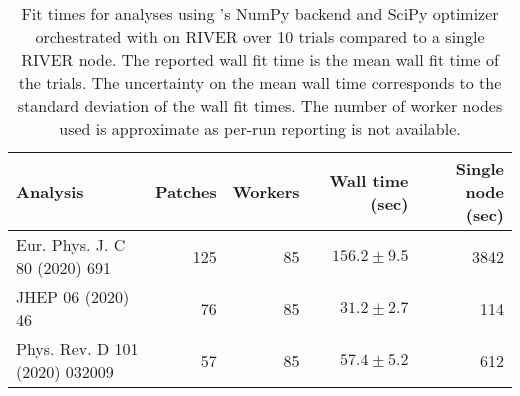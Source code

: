 \begin{table}[htpb]
\centering
\caption{Fit times for analyses using \pyhf{}'s NumPy backend and SciPy optimizer orchestrated with \funcX{} on RIVER over 10 trials compared to a single RIVER node. The reported wall fit time is the mean wall fit time of the trials. The uncertainty on the mean wall time corresponds to the standard deviation of the wall fit times. The number of worker nodes used is approximate as per-run reporting is not available.}
\label{table:performance}
\begin{tabular}{@{}lrrrr@{}}
\toprule
                      Analysis & Patches & Workers & Wall time (sec) & Single node (sec) \\
\midrule
 Eur. Phys. J. C 80 (2020) 691 &     125 &      85 &   $156.2\pm9.5$ &              3842 \\
             JHEP 06 (2020) 46 &      76 &      85 &    $31.2\pm2.7$ &               114 \\
Phys. Rev. D 101 (2020) 032009 &      57 &      85 &    $57.4\pm5.2$ &               612 \\
\bottomrule
\end{tabular}
\end{table}
